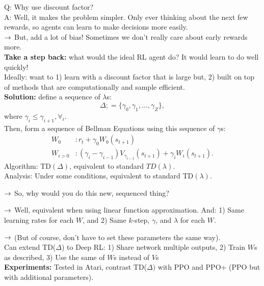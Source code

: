 Q: Why use discount factor?\\

A: Well, it makes the problem simpler. Only ever thinking about the next few rewards, so agents can learn to make decisions more easily.\\

$\rightarrow$ But, add a lot of bias! Sometimes we don't really care about early rewards more. \\

{\bf Take a step back:} what would the ideal RL agent do? It would learn to do well quickly! \\

Ideally: want to 1) learn with a discount factor that is large but, 2) built on top of methods that are computationally and sample efficient. \\

{\bf Solution:} define a sequence of $\lambda$s:
\[
\Delta ;= \{\gamma_0, \gamma_1, \ldots, \gamma_Z\},
\]
where $\gamma_i \leq \gamma_{i+1}, \forall_i$. \\

Then, form a sequence of Bellman Equations using this sequence of $\gamma$s:
\begin{align}
W_0 &: r_t + \gamma_0 W_0(s_{t+1}) \\
W_{i > 0} &: (\gamma_i - \gamma_{i-1})V_{\gamma_{i-1}}(s_{t+1}) + \gamma_i W_i(s_{t+1}).
\end{align}
Algorithm: TD$(\Delta)$, equivalent to standard $TD(\lambda)$. \\

Analysis: Under some conditions, equivalent to standard TD$(\lambda)$.
    
    $\rightarrow$ So, why would you do this new, sequenced thing?
    
    $\rightarrow$ Well, equivalent when using linear function approximation. And: 1) Same learning rates for each $W$, and 2) Same $k$-step, $\gamma$, and $\lambda$ for each $W$.
    
    $\rightarrow$ (But of course, don't have to set these parameters the same way). \\
    
Can extend TD($\Delta$) to Deep RL: 1) Share network multiple outputs, 2) Train $W$s as described, 3) Use the same of $W$s instead of $V$s \\

{\bf Experiments:} Tested in Atari, contrast TD($\Delta)$ with PPO and PPO+ (PPO but with additional parameters). \\

